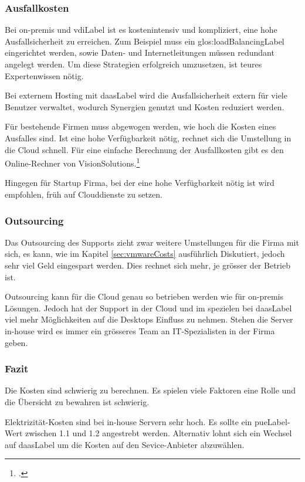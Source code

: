 \subsubsection{Ausfallkosten}
Bei on-premis und \Gls{vdiLabel} ist es kostenintensiv und kompliziert, eine hohe Ausfallsicherheit zu erreichen. Zum Beispiel muss ein \gls{glos:loadBalancingLabel} eingerichtet werden, sowie Daten- und Internetleitungen müssen redundant angelegt werden. Um diese Strategien erfolgreich umzusetzen, ist teures Expertenwissen nötig.

Bei externem Hosting mit \Gls{daasLabel} wird die Ausfallsicherheit extern für viele Benutzer verwaltet, wodurch Synergien genutzt und Kosten reduziert werden.

Für bestehende Firmen muss abgewogen werden, wie hoch die Kosten eines Ausfalles sind. Ist eine hohe Verfügbarkeit nötig, rechnet sich die Umstellung in die Cloud schnell. Für eine einfache Berechnung der Ausfallkosten gibt es den Online-Rechner von VisionSolutions.\footcite{Disaster_Recovery_Resouce_Center_-_Vision_Solutions_2014-12-22}

Hingegen für Startup Firma, bei der eine hohe Verfügbarkeit nötig ist wird empfohlen, früh auf Clouddienste zu setzen.

\subsubsection{Outsourcing}
Das Outsourcing des Supports zieht zwar weitere Umstellungen für die Firma mit sich, es kann, wie im Kapitel \cref{sec:vmwareCosts} ausführlich Diskutiert, jedoch sehr viel Geld eingespart werden. Dies rechnet sich mehr, je grösser der Betrieb ist.

Outsourcing kann für die Cloud genau so betrieben werden wie für on-premis Lösungen. Jedoch hat der Support in der Cloud und im spezielen bei \Gls{daasLabel} viel mehr Möglichkeiten auf die Desktops Einfluss zu nehmen. Stehen die Server in-house wird es immer ein grösseres Team an IT-Spezialisten in der Firma geben.

\subsubsection{Fazit}
Die Kosten sind schwierig zu berechnen. Es spielen viele Faktoren eine Rolle und die Übersicht zu bewahren ist schwierig.

Elektrizität-Kosten sind bei in-house Servern sehr hoch. Es sollte ein \Gls{pueLabel}-Wert zwischen 1.1 und 1.2 angestrebt werden. Alternativ lohnt sich ein Wechsel auf \Gls{daasLabel} um die Kosten auf den Sevice-Anbieter abzuwählen.

